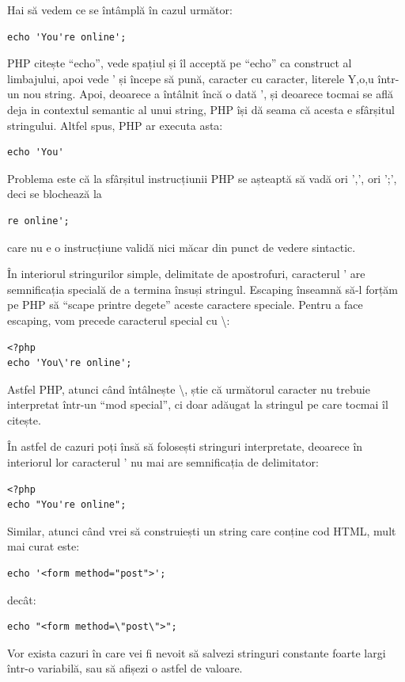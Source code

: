 Hai să vedem ce se întâmplă în cazul următor:
\begin{lstlisting}
echo 'You're online';
\end{lstlisting}
PHP citește ``echo'', vede spațiul și îl acceptă pe ``echo''
ca construct al limbajului, apoi vede ' și începe să
pună, caracter cu caracter, literele Y,o,u într-un nou string.
Apoi, deoarece a întâlnit încă o dată ', și deoarece tocmai se află
deja in contextul semantic al unui string, PHP își dă seama că
acesta e sfârșitul stringului. Altfel spus, PHP ar executa asta:
\begin{lstlisting}
echo 'You'
\end{lstlisting}
Problema este că la sfârșitul instrucțiunii PHP se așteaptă să
vadă ori ',', ori ';', deci se blochează la
\begin{lstlisting}
re online';
\end{lstlisting}
care nu e o instrucțiune validă nici măcar din punct
de vedere sintactic.

În interiorul stringurilor
simple, delimitate de apostrofuri, caracterul ' are semnificația
specială de a termina însuși stringul.
Escaping înseamnă să-l forțăm pe PHP să ``scape printre degete''
aceste caractere speciale. Pentru a face escaping, vom precede caracterul
special cu \textbackslash:
\begin{lstlisting}
<?php
echo 'You\'re online';
\end{lstlisting}
Astfel PHP, atunci când întâlnește \textbackslash, știe că
următorul caracter nu trebuie interpretat într-un ``mod special'',
ci doar adăugat la stringul pe care tocmai îl citește.

În astfel de cazuri poți însă să folosești stringuri interpretate,
deoarece în interiorul lor caracterul ' nu mai are semnificația de
delimitator:
\begin{lstlisting}
<?php
echo "You're online";
\end{lstlisting}

Similar, atunci când vrei să construiești un string care conține
cod HTML, mult mai curat este:
\begin{lstlisting}
echo '<form method="post">';
\end{lstlisting}
decât:
\begin{lstlisting}
echo "<form method=\"post\">";
\end{lstlisting}



Vor exista cazuri în care vei fi nevoit să salvezi stringuri constante
foarte largi într-o variabilă, sau să afișezi o astfel de valoare.

